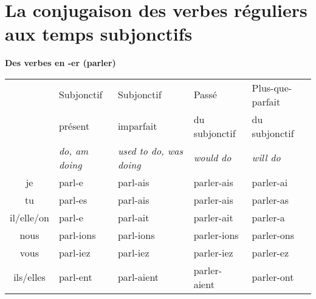 

\section{La conjugaison des verbes r\'eguliers aux temps subjonctifs}
\setcounter{theorem}{0}
\setcounter{equation}{0}

\renewcommand{\stemPresent}{parl}
\renewcommand{\stemFutur}{parler}
\begin{center}
\textbf{Des verbes en -er (parler)}
\vskip 0.1cm
\begin{tabular}{|c||L{3cm}|L{3cm}|L{3cm}|L{3cm}|}
\hline
& Subjonctif & Subjonctif & Pass\'{e} & Plus-que-parfait \\
& pr\'esent & imparfait & du subjonctif & du subjonctif \\
\hline
& \textit{do, am doing} & \textit{used to do, was doing} & \textit{would do} & \textit{will do} \\
\hline\hline
je            &	\stemPresent-e	&	\stemPresent-ais	&	\stemFutur-ais	 &	\stemFutur-ai	\\
tu            &	\stemPresent-es	&	\stemPresent-ais	&	\stemFutur-ais	&	\stemFutur-as	\\
il/elle/on  &	\stemPresent-e	&	\stemPresent-ait	&	\stemFutur-ait	&	\stemFutur-a	\\
nous       &	\stemPresent-ions	&	\stemPresent-ions	&	\stemFutur-ions	&	\stemFutur-ons	\\
vous       &	\stemPresent-iez	&	\stemPresent-iez	&	\stemFutur-iez		&	\stemFutur-ez	\\
ils/elles   &	\stemPresent-ent	&	\stemPresent-aient	&	\stemFutur-aient	&	\stemFutur-ont	\\
\hline
\end{tabular}
\end{center}

